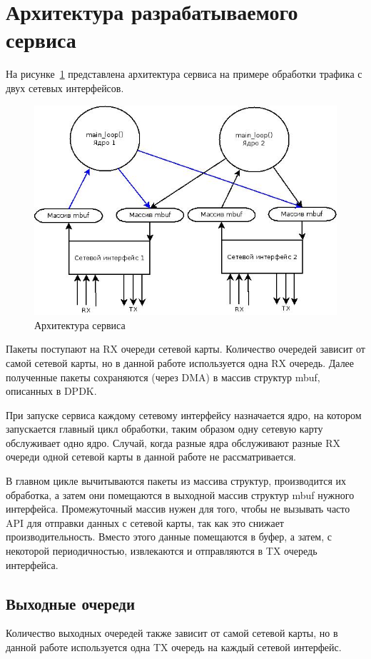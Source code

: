 \section{Архитектура разрабатываемого сервиса}
На рисунке~\ref{pic:concept_schema} представлена архитектура сервиса на примере обработки трафика с двух сетевых интерфейсов.
\begin{figure}[h]
\centering
\includegraphics[scale=0.6]{pictures/concept_schema}
\caption{Архитектура сервиса}
\label{pic:concept_schema}
\end{figure}

Пакеты поступают на RX очереди сетевой карты. Количество очередей зависит от самой сетевой карты, но в данной работе используется одна RX очередь. Далее полученные пакеты сохраняются (через DMA) в массив структур mbuf, описанных в DPDK.

При запуске сервиса каждому сетевому интерфейсу назначается ядро, на котором запускается главный цикл обработки, таким образом одну сетевую карту обслуживает одно ядро. Случай, когда разные ядра обслуживают разные RX очереди одной сетевой карты в данной работе не рассматривается.

В главном цикле вычитываются пакеты из массива структур, производится их обработка, а затем они помещаются  в выходной массив структур mbuf нужного интерфейса. Промежуточный массив нужен для того, чтобы не вызывать часто API для отправки данных с сетевой карты, так как это снижает производительность. Вместо этого данные помещаются в буфер, а затем, с некоторой периодичностью, извлекаются и отправляются в TX очередь интерфейса.

\subsection{Выходные очереди}
Количество выходных очередей также зависит от самой сетевой карты, но в данной работе используется одна TX очередь на каждый сетевой интерфейс.

